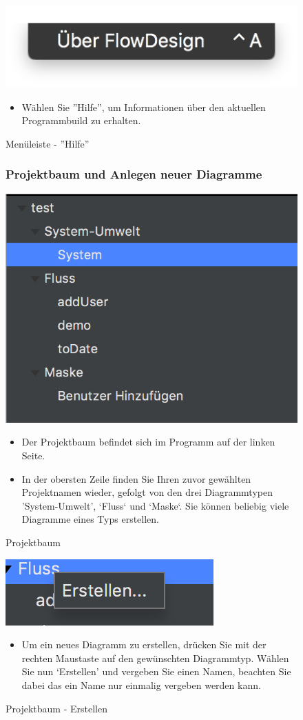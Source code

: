 \begin{figure}[h!]
	\centering
	\includegraphics[width=.4\textwidth]{Leiste_Hilfe.png}
	\caption{Menüleiste - ''Hilfe''}
\begin{itemize}
\item Wählen Sie ''Hilfe'', um Informationen über den aktuellen Programmbuild zu erhalten.	
\end{itemize}
\end{figure}






\begin{figure}[h!]
\subsubsection{Projektbaum und Anlegen neuer Diagramme}
	\centering
	\includegraphics[width=.4\textwidth]{Projektbaum.png}
	\caption{Projektbaum}
\begin{itemize}
\item Der Projektbaum befindet sich im Programm auf der linken Seite.
\item In der obersten Zeile finden Sie Ihren zuvor gewählten Projektnamen wieder, gefolgt von den drei Diagrammtypen 'System-Umwelt', ‘Fluss‘ und ‘Maske‘. Sie können beliebig viele Diagramme eines Typs erstellen.
\end{itemize}
\end{figure}


\begin{figure}[h!]
	\centering
	\includegraphics[width=.4\textwidth]{Projektbaum_Erstellen.png}
	\caption{Projektbaum - Erstellen}
\begin{itemize}
\item Um ein neues Diagramm zu erstellen, drücken Sie mit der rechten Maustaste auf den gewünschten Diagrammtyp. Wählen Sie nun ‘Erstellen' und vergeben Sie einen Namen, beachten Sie dabei das ein Name nur einmalig vergeben werden kann. 
\end{itemize}
\end{figure}




